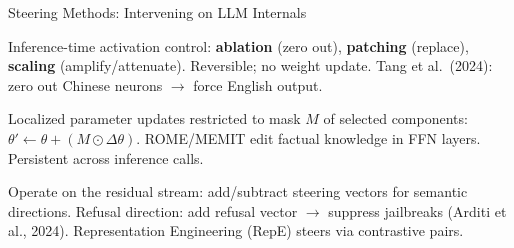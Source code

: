 \begin{frame}{Steering Methods: Intervening on LLM Internals}
  \begin{tcolorbox}[enhanced, colback=UCRlgray, colframe=UCRmgray,
      borderline west={4pt}{0pt}{UCRnavy}, sharp corners,
      fonttitle=\bfseries\small\color{UCRnavy}, title=Amplitude Manipulation,
      top=3pt, bottom=3pt]
    \footnotesize Inference-time activation control: \textbf{ablation} (zero out),
    \textbf{patching} (replace), \textbf{scaling} (amplify/attenuate).
    Reversible; no weight update. Tang et al.\ (2024): zero out Chinese neurons $\to$
    force English output.
    \hfill{}
  \end{tcolorbox}
  \vspace{3pt}
  \begin{tcolorbox}[enhanced, colback=UCRlgray, colframe=UCRmgray,
      borderline west={4pt}{0pt}{UCRnavy}, sharp corners,
      fonttitle=\bfseries\small\color{UCRnavy}, title=Targeted Optimization,
      top=3pt, bottom=3pt]
    \footnotesize Localized parameter updates restricted to mask $M$ of selected components:
    $\theta' \leftarrow \theta + (M \odot \Delta\theta)$.
    ROME/MEMIT edit factual knowledge in FFN layers.
    Persistent across inference calls.
    \hfill{}
  \end{tcolorbox}
  \vspace{3pt}
  \begin{tcolorbox}[enhanced, colback=UCRlgray, colframe=UCRmgray,
      borderline west={4pt}{0pt}{UCRnavy}, sharp corners,
      fonttitle=\bfseries\small\color{UCRnavy}, title=Vector Arithmetic,
      top=3pt, bottom=3pt]
    \footnotesize Operate on the residual stream: add/subtract steering vectors
    for semantic directions. Refusal direction: add refusal vector $\to$ suppress
    jailbreaks (Arditi et al., 2024). Representation Engineering (RepE) steers
    via contrastive pairs.
    \hfill{}
  \end{tcolorbox}
\end{frame}

